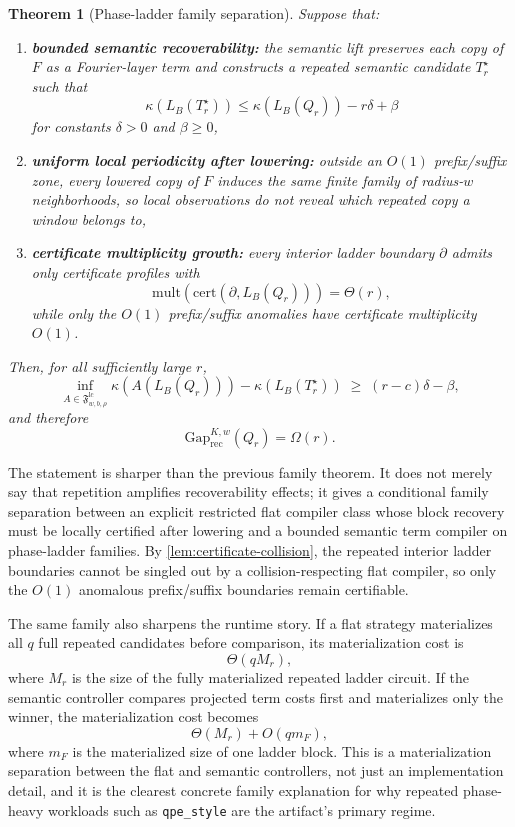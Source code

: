 \documentclass[11pt]{article}
\newtheorem{theorem}{Theorem}
\begin{document}
\begin{theorem}[Phase-ladder family separation]
Suppose that:
\begin{enumerate}[leftmargin=1.5em]
    \item \textbf{bounded semantic recoverability:} the semantic lift preserves each copy of $F$ as a Fourier-layer term and constructs a repeated semantic candidate $T_r^\star$ such that
    \[
    \kappa(L_B(T_r^\star)) \le \kappa(L_B(Q_r)) - r\delta + \beta
    \]
    for constants $\delta > 0$ and $\beta \ge 0$,
    \item \textbf{uniform local periodicity after lowering:} outside an $O(1)$ prefix/suffix zone, every lowered copy of $F$ induces the same finite family of radius-$w$ neighborhoods, so local observations do not reveal which repeated copy a window belongs to,
    \item \textbf{certificate multiplicity growth:} every interior ladder boundary $\partial$ admits only certificate profiles with
    \[
    \mathrm{mult}(\mathrm{cert}(\partial, L_B(Q_r))) = \Theta(r),
    \]
    while only the $O(1)$ prefix/suffix anomalies have certificate multiplicity $O(1)$.
\end{enumerate}
Then, for all sufficiently large $r$,
\[
\inf_{A \in \mathfrak{F}^{\mathrm{lc}}_{w,b,\rho}} \kappa(A(L_B(Q_r))) - \kappa(L_B(T_r^\star))
\;\ge\;
(r-c)\delta - \beta,
\]
and therefore
\[
\mathrm{Gap}^{K,w}_{\mathrm{rec}}(Q_r) = \Omega(r).
\]
\end{theorem}

The statement is sharper than the previous family theorem. It does not merely
say that repetition amplifies recoverability effects; it gives a conditional
family separation between an explicit restricted flat compiler class whose
block recovery must be locally certified after lowering and a bounded semantic
term compiler on phase-ladder families. By
\cref{lem:certificate-collision}, the repeated
interior ladder boundaries cannot be singled out by a collision-respecting
flat compiler, so only the $O(1)$ anomalous prefix/suffix boundaries remain
certifiable.

The same family also sharpens the runtime story. If a flat strategy
materializes all $q$ full repeated candidates before comparison, its
materialization cost is
\[
\Theta(q M_r),
\]
where $M_r$ is the size of the fully materialized repeated ladder circuit. If
the semantic controller compares projected term costs first and materializes
only the winner, the materialization cost becomes
\[
\Theta(M_r) + O(q m_F),
\]
where $m_F$ is the materialized size of one ladder block. This is a
materialization separation between the flat and semantic controllers, not just
an implementation detail, and it is the clearest concrete family explanation
for why repeated phase-heavy workloads such as \texttt{qpe\_style} are the
artifact's primary regime.
\end{document}

